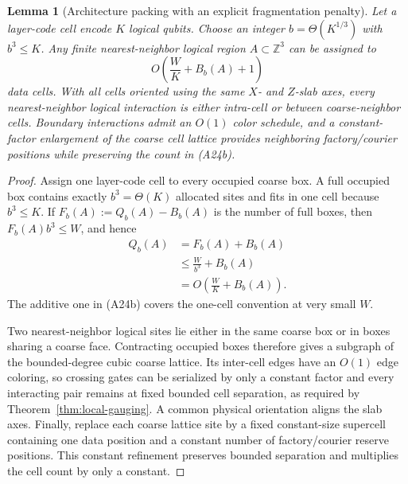 \documentclass[aps,prx,reprint,superscriptaddress,nofootinbib,floatfix,longbibliography]{revtex4-2}
\newtheorem{lemma}[theorem]{Lemma}
\theoremstyle{definition}
\begin{document}
\begin{lemma}[Architecture packing with an explicit fragmentation penalty]
\label{lem:architecture-packing}
Let a layer-code cell encode $K$ logical qubits.  Choose an integer
$b=\Theta(K^{1/3})$ with $b^3\le K$.  Any finite nearest-neighbor logical
region $A\subset\mathbb Z^3$ can be assigned to
\begin{equation}
 O\!\left(\frac{W}{K}+B_b(A)+1\right)                                \tag{A24b}
\end{equation}
data cells.  With all cells oriented using the same $X$- and $Z$-slab axes,
every nearest-neighbor logical interaction is either intra-cell or between
coarse-neighbor cells.  Boundary interactions admit an $O(1)$ color
schedule, and a constant-factor enlargement of the coarse cell lattice
provides neighboring factory/courier positions while preserving the count in
(A24b).
\end{lemma}
\begin{proof}
Assign one layer-code cell to every occupied coarse box.  A full occupied box
contains exactly $b^3=\Theta(K)$ allocated sites and fits in one cell because
$b^3\le K$.  If $F_b(A):=Q_b(A)-B_b(A)$ is the number of full boxes, then
$F_b(A)b^3\le W$, and hence
\begin{align*}
 Q_b(A)&=F_b(A)+B_b(A)\\
 &\le \frac{W}{b^3}+B_b(A)\\
 &=O\!\left(\frac{W}{K}+B_b(A)\right).
\end{align*}
The additive one in (A24b) covers the one-cell convention at very small $W$.

Two nearest-neighbor logical sites lie either in the same coarse box or in
boxes sharing a coarse face.  Contracting occupied boxes therefore gives a
subgraph of the bounded-degree cubic coarse lattice.  Its inter-cell edges
have an $O(1)$ edge coloring, so crossing gates can be serialized by only a
constant factor and every interacting pair remains at fixed bounded cell
separation, as required by Theorem~\ref{thm:local-gauging}.  A
common physical orientation aligns the slab axes.  Finally, replace each
coarse lattice site by a fixed constant-size supercell containing one data
position and a constant number of factory/courier reserve positions.  This
constant refinement preserves bounded separation and multiplies the cell
count by only a constant.
\end{proof}
\end{document}
